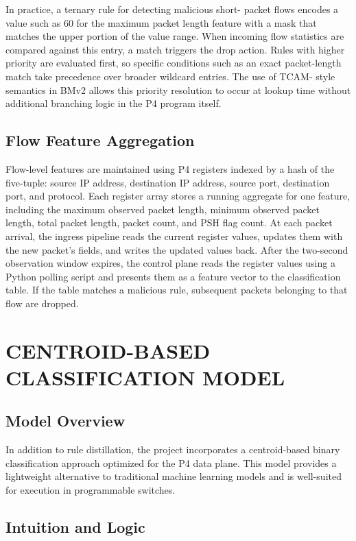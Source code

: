\documentclass[conference]{IEEEtran}
\begin{document}
In practice, a ternary rule for detecting malicious short-
packet flows encodes a value such as 60 for the maximum
packet length feature with a mask that matches the upper
portion of the value range. When incoming flow statistics
are compared against this entry, a match triggers the drop
action. Rules with higher priority are evaluated first, so
specific conditions such as an exact packet-length match take
precedence over broader wildcard entries. The use of TCAM-
style semantics in BMv2 allows this priority resolution to
occur at lookup time without additional branching logic in
the P4 program itself.

\subsection{Flow Feature Aggregation}

Flow-level features are maintained using P4 registers indexed
by a hash of the five-tuple: source IP address, destination IP
address, source port, destination port, and protocol. Each
register array stores a running aggregate for one feature,
including the maximum observed packet length, minimum
observed packet length, total packet length, packet count,
and PSH flag count. At each packet arrival, the ingress
pipeline reads the current register values, updates them with
the new packet's fields, and writes the updated values back.
After the two-second observation window expires, the control
plane reads the register values using a Python polling script
and presents them as a feature vector to the classification
table. If the table matches a malicious rule, subsequent
packets belonging to that flow are dropped.

\section{CENTROID-BASED CLASSIFICATION MODEL}

\subsection{Model Overview}

In addition to rule distillation, the project incorporates a
centroid-based binary classification approach optimized for the
P4 data plane. This model provides a lightweight alternative
to traditional machine learning models and is well-suited for
execution in programmable switches.

\subsection{Intuition and Logic}
\end{document}
